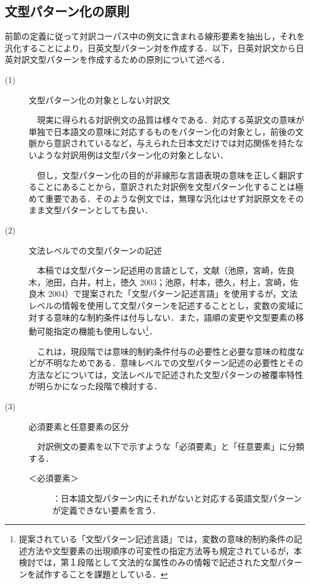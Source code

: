 \documentclass{nlp}
\begin{document}
\subsection{文型パターン化の原則}

前節の定義に従って対訳コーパス中の例文に含まれる線形要素を抽出し，それを汎化することにより，日英文型パターン対を作成する．以下，日英対訳文から日英対訳文型パターンを作成するための原則について述べる．

\begin{description}

\item[(1)] 文型パターン化の対象としない対訳文 

\verb|  |現実に得られる対訳例文の品質は様々である．対応する英訳文の意味が単独で日本語文の意味に対応するものをパターン化の対象とし，前後の文脈から意訳されているなど，与えられた日本文だけでは対応関係を持たないような対訳用例は文型パターン化の対象としない．

\verb|  |但し，文型パターン化の目的が非線形な言語表現の意味を正しく翻訳することにあることから，意訳された対訳例を文型パターン化することは極めて重要である．そのような例文では，無理な汎化はせず対訳原文をそのまま文型パターンとしても良い．

\item[(2)] 文法レベルでの文型パターンの記述 

\verb|  |本稿では文型パターン記述用の言語として，文献（池原，宮崎，佐良木，池田，白井，村上，徳久 2003；池原，村本，徳久，村上，宮崎，佐良木 2004）で提案された「文型パターン記述言語」を使用するが，文法レベルの情報を使用して文型パターンを記述することとし，変数の変域に対する意味的な制約条件は付与しない．また，語順の変更や文型要素の移動可能指定の機能も使用しない\footnote{提案されている「文型パターン記述言語」では，変数の意味的制約条件の記述方法や文型要素の出現順序の可変性の指定方法等も規定されているが，本検討では，第１段階として文法的な属性のみの情報で記述された文型パターンを試作することを課題としている．}．

\verb|  |これは，現段階では意味的制約条件付与の必要性と必要な意味の粒度などが不明なためである．意味レベルでの文型パターン記述の必要性とその方法などについては，文法レベルで記述された文型パターンの被覆率特性が明らかになった段階で検討する．
\item[(3)] 必須要素と任意要素の区分 

\verb|  |対訳例文の要素を以下で示すような「必須要素」と「任意要素」に分類する．

\begin{description}
\item[＜必須要素＞]：日本語文型パターン内にそれがないと対応する英語文型パターンが定義できない要素を言う．


\end{description}
\end{description}
\end{document}
